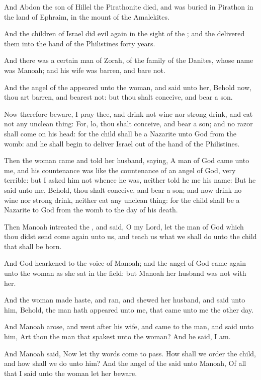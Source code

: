 \Verse And Abdon the son of Hillel the Pirathonite died, and was buried in Pirathon in the land of Ephraim, in the mount of the Amalekites.


\Chapter
\Verse And the children of Israel did evil again in the sight of the \LORD; and the \LORD delivered them into the hand of the Philistines forty years.

\Verse And there was a certain man of Zorah, of the family of the Danites, whose name was Manoah; and his wife was barren, and bare not.

\Verse And the angel of the \LORD appeared unto the woman, and said unto her, Behold now, thou art barren, and bearest not: but thou shalt conceive, and bear a son.

\Verse Now therefore beware, I pray thee, and drink not wine nor strong drink, and eat not any unclean thing: \Verse For, lo, thou shalt conceive, and bear a son; and no razor shall come on his head: for the child shall be a Nazarite unto God from the womb: and he shall begin to deliver Israel out of the hand of the Philistines.

\Verse Then the woman came and told her husband, saying, A man of God came unto me, and his countenance was like the countenance of an angel of God, very terrible: but I asked him not whence he was, neither told he me his name: \Verse But he said unto me, Behold, thou shalt conceive, and bear a son; and now drink no wine nor strong drink, neither eat any unclean thing: for the child shall be a Nazarite to God from the womb to the day of his death.

\Verse Then Manoah intreated the \LORD, and said, O my Lord, let the man of God which thou didst send come again unto us, and teach us what we shall do unto the child that shall be born.

\Verse And God hearkened to the voice of Manoah; and the angel of God came again unto the woman as she sat in the field: but Manoah her husband was not with her.

\Verse And the woman made haste, and ran, and shewed her husband, and said unto him, Behold, the man hath appeared unto me, that came unto me the other day.

\Verse And Manoah arose, and went after his wife, and came to the man, and said unto him, Art thou the man that spakest unto the woman? And he said, I am.

\Verse And Manoah said, Now let thy words come to pass. How shall we order the child, and how shall we do unto him?  \Verse And the angel of the \LORD said unto Manoah, Of all that I said unto the woman let her beware.

